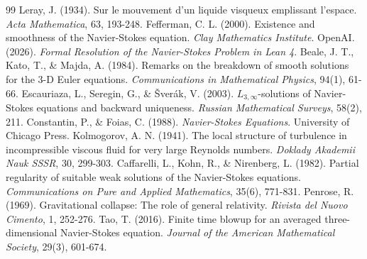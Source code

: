 \documentclass[11pt,a4paper]{article}
\theoremstyle{definition}
\begin{document}
\begin{thebibliography}{99}
 Leray, J. (1934). Sur le mouvement d'un liquide visqueux emplissant l'espace. \textit{Acta Mathematica}, 63, 193-248.
 Fefferman, C. L. (2000). Existence and smoothness of the Navier-Stokes equation. \textit{Clay Mathematics Institute}.
 OpenAI. (2026). \textit{Formal Resolution of the Navier-Stokes Problem in Lean 4}. 
 Beale, J. T., Kato, T., \& Majda, A. (1984). Remarks on the breakdown of smooth solutions for the 3-D Euler equations. \textit{Communications in Mathematical Physics}, 94(1), 61-66.
 Escauriaza, L., Seregin, G., \& \v{S}ver\'{a}k, V. (2003). $L_{3,\infty}$-solutions of Navier-Stokes equations and backward uniqueness. \textit{Russian Mathematical Surveys}, 58(2), 211.
 Constantin, P., \& Foias, C. (1988). \textit{Navier-Stokes Equations}. University of Chicago Press.
 Kolmogorov, A. N. (1941). The local structure of turbulence in incompressible viscous fluid for very large Reynolds numbers. \textit{Doklady Akademii Nauk SSSR}, 30, 299-303.
 Caffarelli, L., Kohn, R., \& Nirenberg, L. (1982). Partial regularity of suitable weak solutions of the Navier-Stokes equations. \textit{Communications on Pure and Applied Mathematics}, 35(6), 771-831.
 Penrose, R. (1969). Gravitational collapse: The role of general relativity. \textit{Rivista del Nuovo Cimento}, 1, 252-276.
 Tao, T. (2016). Finite time blowup for an averaged three-dimensional Navier-Stokes equation. \textit{Journal of the American Mathematical Society}, 29(3), 601-674.
\end{thebibliography}
\end{document}
